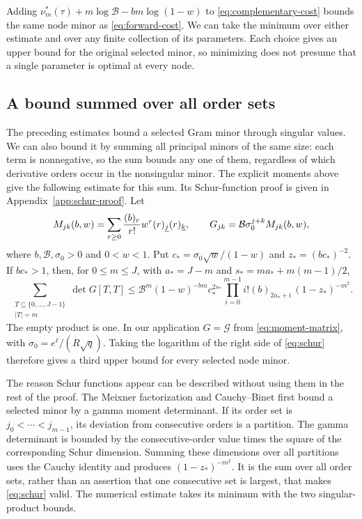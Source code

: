 Adding $\nu_m^*(\tau)+m\log\mathcal B-bm\log(1-w)$ to \eqref{eq:complementary-cost} bounds the same node minor as \eqref{eq:forward-cost}. We can take the minimum over either estimate and over any finite collection of its parameters. Each choice gives an upper bound for the original selected minor, so minimizing does not presume that a single parameter is optimal at every node.

\subsection{A bound summed over all order sets}
The preceding estimates bound a selected Gram minor through singular values.
We can also bound it by summing all principal minors of the same size: each
term is nonnegative, so the sum bounds any one of them, regardless of which
derivative orders occur in the nonsingular minor. The explicit moments above
give the following estimate for this sum. Its Schur-function proof is given
in Appendix~\ref{app:schur-proof}. Let
\[
 M_{jk}(b,w)=\sum_{r\geq0}\frac{(b)_r}{r!}w^r(r)_{\underline{j}}(r)_{\underline{k}},\qquad
 G_{jk}=\mathcal B\sigma_0^{j+k}M_{jk}(b,w),
\]
where $b,\mathcal B,\sigma_0>0$ and $0<w<1$. Put
$c_* =\sigma_0\sqrt w/(1-w)$ and $z_*=(bc_*)^{-2}$.
If $bc_*>1$, then, for $0\leq m\leq J$, with $a_*=J-m$ and
$s_*=ma_*+m(m-1)/2$,
\begin{equation}\label{eq:schur}
 \sum_{\substack{T\subseteq\{0,\ldots,J-1\}\\|T|=m}}
 \det G[T,T]
 \leq \mathcal B^m(1-w)^{-bm}c_*^{2s_*}
       \prod_{i=0}^{m-1}i!(b)_{2a_*+i}\,(1-z_*)^{-m^2}.
\end{equation}
The empty product is one. In our application $G=\mathcal G$ from
\eqref{eq:moment-matrix}, with $\sigma_0=e^\ell/(R\sqrt q)$. Taking the
logarithm of the right side of \eqref{eq:schur} therefore gives a third
upper bound for every selected node minor.

The reason Schur functions appear can be described without using them in the rest of the proof. The Meixner factorization and Cauchy--Binet first bound a selected minor by a gamma moment determinant. If its order set is $j_0<\cdots<j_{m-1}$, its deviation from consecutive orders is a partition. The gamma determinant is bounded by the consecutive-order value times the square of the corresponding Schur dimension. Summing these dimensions over all partitions uses the Cauchy identity and produces $(1-z_*)^{-m^2}$. It is the sum over all order sets, rather than an assertion that one consecutive set is largest, that makes \eqref{eq:schur} valid. The numerical estimate takes its minimum with the two singular-product bounds.

